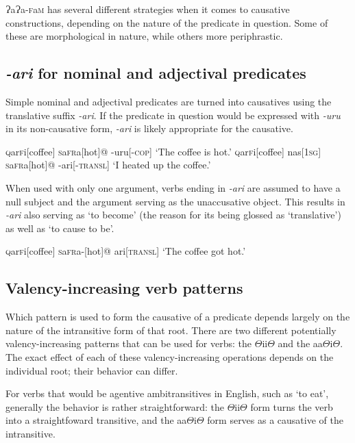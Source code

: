 \documentclass[a4paper,10pt,twoside,openright]{memoir}
\newcommand{\lang}{{\bigglot}a{\bigglot}a-\textsc{f}a\textsc{m}}
\newcommand{\rootpart}{$\Theta$}
\newcommand{\bigglot}{Ɂ}
\newcommand{\famwordold}[5]{#1\textsc{#2}#3\textsc{#4}#5}
\begin{document}
\lang{} has several different strategies when it comes to causative constructions, depending on the nature of the predicate in question. Some of these are morphological in nature, while others more periphrastic. 

\subsection{\textit{-ari} for nominal and adjectival predicates}

Simple nominal and adjectival predicates are turned into causatives using the translative suffix \textit{-ari}. If the predicate in question would be expressed with \textit{-uru} in its non-causative form, \textit{-ari} is likely appropriate for the causative.

\pex
\a
\begingl
\famwordold{}{q}{ar}{f}{i}[coffee]
\famwordold{}{s}{a}{fr}{a}[hot]@
-uru[\textsc{-cop}]
\glft `The coffee is hot.'
\endgl
\a
\begingl
\famwordold{}{q}{ar}{f}{i}[coffee]
nas[\textsc{1sg}]
\famwordold{}{s}{a}{fr}{a}[hot]@
-ari[-\textsc{transl}]
\glft `I heated up the coffee.'
\endgl
\xe

When used with only one argument, verbs ending in \textit{-ari} are assumed to have a null subject and the argument serving as the unaccusative object. This results in \textit{-ari} also serving as `to become' (the reason for its being glossed as `translative') as well as `to cause to be'.

\ex
\begingl
\famwordold{}{q}{ar}{f}{i}[coffee]
\famwordold{}{s}{a}{fr}{a}-[hot]@
ari[\textsc{transl}]
\glft `The coffee got hot.'
\endgl
\xe

\subsection{Valency-increasing verb patterns}

Which pattern is used to form the causative of a predicate depends largely on the nature of the intransitive form of that root. There are two different potentially valency-increasing patterns that can be used for verbs: the {\rootpart}ii{\rootpart} and the aa{\rootpart}i{\rootpart}. The exact effect of each of these valency-increasing operations depends on the individual root; their behavior can differ.

For verbs that would be agentive ambitransitives in English, such as `to eat', generally the behavior is rather straightforward: the {\rootpart}ii{\rootpart} form turns the verb into a straightfoward transitive, and the aa{\rootpart}i{\rootpart} form serves as a causative of the intransitive. 
\end{document}
